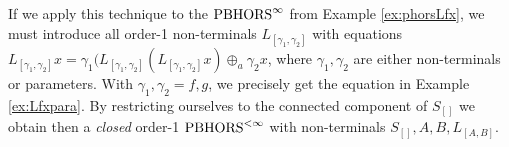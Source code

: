 \begin{example}

If we apply this technique to the $\text{PBHORS}^{\infty}$ from Example \ref{ex:phorsLfx},
we must introduce all order-1 non-terminals $L_{[\gamma_1,\gamma_2]}$ with equations
$L_{[\gamma_1,\gamma_2]}x=\gamma_1(L_{[\gamma_1,\gamma_2]}(L_{[\gamma_1,\gamma_2]}x)\oplus_a \gamma_2x$, where $\gamma_1,\gamma_2$ are either non-terminals or parameters. With $\gamma_1,\gamma_2=f,g$, we precisely get the equation in Example \ref{ex:Lfxpara}. By restricting ourselves to the connected component of $S_{[]}$ we obtain then a \emph{closed} order-1 $\text{PBHORS}^{<\infty}$ with non-terminals $S_{[]},A,B,L_{[A,B]}$.
\end{example}
%


